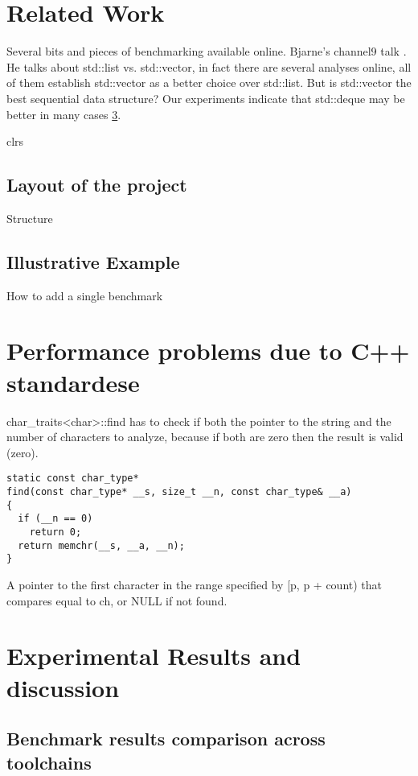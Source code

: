 \documentclass{sig-alternate}
\begin{document}
\section{Related Work}
Several bits and pieces of benchmarking available online.
Bjarne's channel9 talk \cite{stroustrup2012}.
He talks about std::list vs. std::vector, in fact there are several
analyses online, all of them establish std::vector as a better choice
over std::list. But is std::vector the best sequential data structure?
Our experiments indicate that std::deque may be better in many cases \ref{sec:experiments}.

clrs \cite{clrs}

\newpage

\subsection{Layout of the project}
Structure

\subsection{Illustrative Example} \label{subsec:example}
How to add a single benchmark \cite{googlebench}
\newpage


\section{Performance problems due to C++ standardese}
char_traits<char>::find has to check if both the pointer to the string
and the number of characters to analyze, because if both are zero then the result is valid (zero).


\begin{verbatim}
static const char_type*
find(const char_type* __s, size_t __n, const char_type& __a)
{
  if (__n == 0)
    return 0;
  return memchr(__s, __a, __n);
}
\end{verbatim}

A pointer to the first character in the range specified by [p, p + count) that compares equal to ch, or NULL if not found.


\section{Experimental Results and discussion}
\label{sec:experiments}

\subsection{Benchmark results comparison across toolchains}
\end{document}

